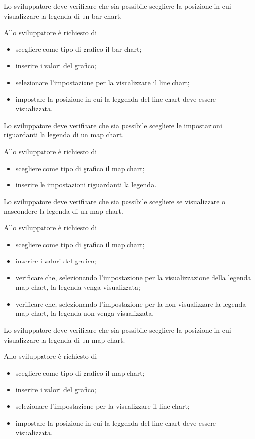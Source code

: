 	Lo sviluppatore deve verificare che sia possibile scegliere la posizione in cui visualizzare la legenda di un bar chart.
			
		Allo sviluppatore è richiesto di
		\begin{itemize}
			\item scegliere come tipo di grafico il bar chart;
			\item inserire i valori del grafico;
			\item selezionare l'impostazione per la visualizzare il line chart;
			\item impostare la posizione in cui la leggenda del line chart deve essere visualizzata.
		\end{itemize}

	Lo sviluppatore deve verificare che sia possibile scegliere le impostazioni riguardanti la legenda di un map chart.

		Allo sviluppatore è richiesto di
		\begin{itemize}
			\item scegliere come tipo di grafico il map chart;
			\item inserire le impostazioni riguardanti la legenda.
		\end{itemize}

	Lo sviluppatore deve verificare che sia possibile scegliere se visualizzare o nascondere la legenda di un map chart.
			
		Allo sviluppatore è richiesto di
		\begin{itemize}
			\item scegliere come tipo di grafico il map chart;
			\item inserire i valori del grafico;
			\item verificare che, selezionando l'impostazione per la visualizzazione della legenda map chart, la legenda venga visualizzata;
			\item verificare che, selezionando l'impostazione per la non visualizzare la legenda map chart, la legenda non venga visualizzata.
		\end{itemize}

	Lo sviluppatore deve verificare che sia possibile scegliere la posizione in cui visualizzare la legenda di un map chart.
			
		Allo sviluppatore è richiesto di
		\begin{itemize}
			\item scegliere come tipo di grafico il map chart;
			\item inserire i valori del grafico;
			\item selezionare l'impostazione per la visualizzare il line chart;
			\item impostare la posizione in cui la leggenda del line chart deve essere visualizzata.
		\end{itemize}

